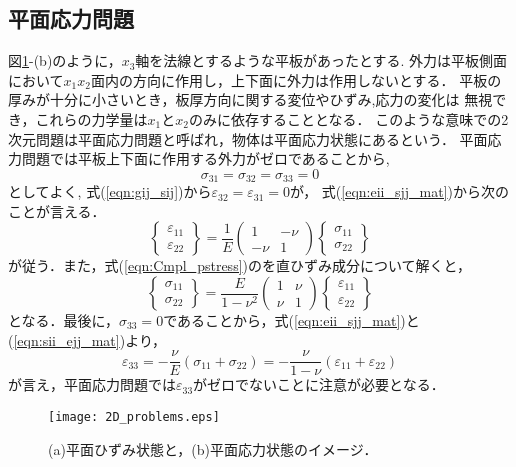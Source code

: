 \documentclass[10pt,a4j]{jarticle}
\begin{document}
\subsection{平面応力問題}
図\ref{fig:fig6_2}-(b)のように，$x_3$軸を法線とするような平板があったとする.
外力は平板側面において$x_1x_2$面内の方向に作用し，上下面に外力は作用しないとする．
平板の厚みが十分に小さいとき，板厚方向に関する変位やひずみ,応力の変化は
無視でき，これらの力学量は$x_1$と$x_2$のみに依存することとなる．
このような意味での2次元問題は平面応力問題と呼ばれ，物体は平面応力状態にあるという．
平面応力問題では平板上下面に作用する外力がゼロであることから, 
\begin{equation}
 \sigma_{31}=\sigma_{32}=\sigma_{33}=0
\end{equation}
としてよく, 式(\ref{eqn:gij_sij})から$\varepsilon_{32}=\varepsilon_{31}=0$が，
式(\ref{eqn:eii_sjj_mat})から次のことが言える．
\begin{equation}
	\left\{ 
	\begin{array}{*{20}{c}}
	\varepsilon _{11}\\
	\varepsilon _{22}
	\end{array}
	\right\} 
	= 
	\frac{1}{E}\left( 
	\begin{array}{*{20}{c}}
	1& - \nu \\
	 - \nu &1
	\end{array}
	\right)
	\left\{ 
	\begin{array}{*{20}{c}}
	\sigma _{11}\\
	\sigma _{22}
	\end{array} 
	\right\}
	\label{eqn:Cmpl_pstress}
\end{equation}
が従う．また，式(\ref{eqn:Cmpl_pstress})のを直ひずみ成分について解くと，
\begin{equation}
	\left\{ 
	\begin{array}{*{20}{c}}
	\sigma _{11}\\
	\sigma _{22}
	\end{array}
	\right\} 
	= 
	\frac{E}{1-\nu^2}\left( 
	\begin{array}{*{20}{c}}
	1&  \nu \\
	  \nu &1
	\end{array}
	\right)
	\left\{ 
	\begin{array}{*{20}{c}}
	\varepsilon _{11}\\
	\varepsilon _{22}
	\end{array} 
	\right\}
	\label{eqn:Hooke_pstress}
\end{equation}
となる．最後に，$\sigma_{33}=0$であることから，式(\ref{eqn:eii_sjj_mat})と(\ref{eqn:sii_ejj_mat})より，
\begin{equation}
	\varepsilon_{33}=-\frac{\nu}{E} \left( \sigma_{11}+\sigma_{22} \right)
	= -\frac{\nu}{1-\nu}\left(\varepsilon_{11}+\varepsilon_{22}\right)
\end{equation}
が言え，平面応力問題では$\varepsilon_{33}$がゼロでないことに注意が必要となる．
\begin{figure}[h]
	\begin{center}
	\texttt{[image: 2D\_problems.eps]} 
	\end{center}
	\caption{
	(a)平面ひずみ状態と，(b)平面応力状態のイメージ．
	 } 
	\label{fig:fig6_2}
\end{figure}
\end{document}
